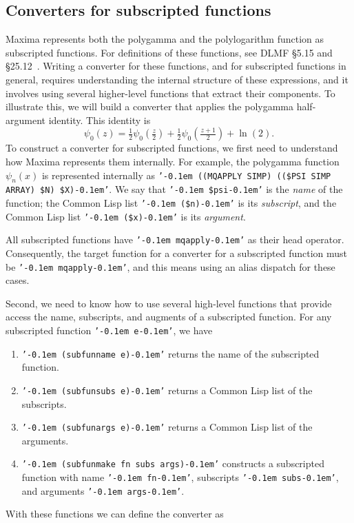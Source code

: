 \documentclass[12pt,fleqn]{extarticle}
\newcommand{\ttq}[1]{\texttt{'\kern-0.1em #1\kern-0.1em'}}
\begin{document}
\subsection{Converters for subscripted functions}

Maxima represents both the polygamma and the polylogarithm function as subscripted functions. For definitions of these functions, see DLMF  §5.15 and §25.12~\cite{DLMF}. Writing a converter for these functions, and for subscripted functions in general, requires understanding the internal structure of these expressions, and it involves using several higher-level functions that extract their components. To illustrate this, we will build a converter that applies the polygamma half-argument identity. This identity is
 \begin{equation}
 \psi_0\left(z\right)=\tfrac{1}{2} \psi_0\left(\tfrac{z}{2}\right)+
   \tfrac{1}{2} \psi_0\left(\tfrac{z+1}{2}\right)+\ln\left(2\right).
 \end{equation}
 To construct a converter for subscripted functions, we first need to understand how Maxima represents them internally. For example, the polygamma function \(\psi _n(x)\) is represented internally as
\ttq{((MQAPPLY SIMP) ((\$PSI SIMP ARRAY) \$N) \$X)}. We say that \ttq{\$psi} is the \emph{name} of the function; the Common Lisp list \ttq{(\$n)} is its \emph{subscript}, and the Common Lisp list \ttq{(\$x)} is its \emph{argument}.

All subscripted functions have \ttq{mqapply} as their head operator.
Consequently, the target function for a converter for a subscripted function must be \ttq{mqapply},
and this means using an alias dispatch for these cases.

Second, we need to know how to use several high-level functions that provide access the name, subscripts, and augments of a subscripted function. For any subscripted function  \ttq{e}, we have 
 \begin{enumerate}[label=(\alph*), itemsep=3pt, topsep=2pt, parsep=0pt]
  \item  \ttq{(subfunname e)} returns the name of the subscripted function.
    
  \item  \ttq{(subfunsubs e)} returns a Common Lisp list of the subscripts.
  
  \item \ttq{(subfunargs e)} returns a Common Lisp list of the arguments.
  
  \item \ttq{(subfunmake fn subs args)} constructs a subscripted function
  with name \ttq{fn}, subscripts \ttq{subs}, and arguments \ttq{args}.
 \end{enumerate}
 \noindent  With these functions we can define the converter as
 
\end{document}
